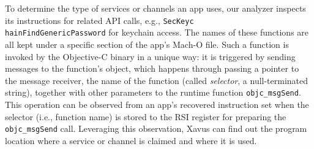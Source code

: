 \documentclass{article}
\newcommand{\ignore}[1]{}
\begin{document}
To determine the type of services or channels an app uses, our analyzer inspects its instructions for related API calls, e.g., \texttt{SecKeyc\\hainFindGenericPassword} for keychain access. The names of these functions are all kept under a specific section of the app's Mach-O file.  Such a function is invoked by the Objective-C binary in a unique way: it is\ignore{ not called directly or using virtual method tables, and instead,} triggered by sending messages to the function's object, which happens through passing a pointer to the message receiver, the name of the function (called \textit{selector}, a null-terminated string), together with other parameters to the runtime function \texttt{objc\_msgSend}. This operation can be observed from an app's recovered instruction set when the selector (i.e., function name) is stored to the RSI register for preparing the \texttt{objc\_msgSend} call. Leveraging this observation, Xavus can find out the program location where a service or channel is claimed and where it is used.

\ignore{In order to detect vulnerable apps that use resources without authentication, we need not only to search for the existence of authentication API, but also to make sure whether the authentication actually happens on the servic or channel that apps claimed. To achive that goal, we need to do static analysis to detect whether the service or channel that the app claimed is passed to any authentication API along its define-use chain between the claiming and using of the channel.}
\end{document}
